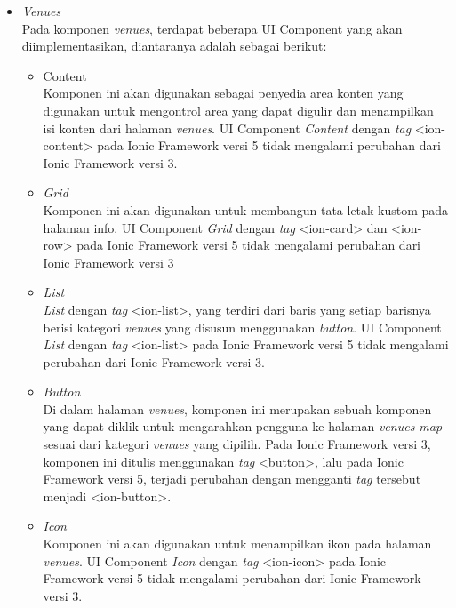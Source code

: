 \begin{itemize}
	\item \textit{Venues}\\
	Pada komponen \textit{venues}, terdapat beberapa UI Component yang akan diimplementasikan, diantaranya adalah sebagai berikut:
		\begin{itemize}
			\item Content \\
		Komponen ini akan digunakan sebagai penyedia area konten yang digunakan untuk mengontrol area yang dapat digulir dan menampilkan isi konten dari halaman \textit{venues}. UI Component \textit{Content} dengan \textit{tag} <ion-content> pada Ionic Framework versi 5 tidak mengalami perubahan dari Ionic Framework versi 3.
			\item \textit{Grid} \\
		Komponen ini akan digunakan untuk membangun tata letak kustom pada halaman info. UI Component \textit{Grid} dengan \textit{tag} <ion-card> dan <ion-row> pada Ionic Framework versi 5 tidak mengalami perubahan dari Ionic Framework versi 3

	
		
			\item \textit{List} \\
		\textit{List} dengan \textit{tag} <ion-list>, yang terdiri dari baris yang setiap barisnya berisi kategori \textit{venues} yang disusun menggunakan \textit{button}. UI Component \textit{List} dengan \textit{tag} <ion-list> pada Ionic Framework versi 5 tidak mengalami perubahan dari Ionic Framework versi 3.
			\item \textit{Button} \\
		Di dalam halaman \textit{venues}, komponen ini merupakan sebuah komponen yang dapat diklik untuk mengarahkan pengguna ke halaman \textit{venues map} sesuai dari kategori \textit{venues} yang dipilih. Pada Ionic Framework versi 3, komponen ini ditulis menggunakan \textit{tag} <button>, lalu pada Ionic Framework versi 5, terjadi perubahan dengan mengganti \textit{tag} tersebut menjadi <ion-button>.
			\item \textit{Icon} \\
		Komponen ini akan digunakan untuk menampilkan ikon pada halaman \textit{venues}. UI Component \textit{Icon} dengan \textit{tag} <ion-icon> pada Ionic Framework versi 5 tidak mengalami perubahan dari Ionic Framework versi 3.
		\end{itemize}

\newpage		
		

\end{itemize}

